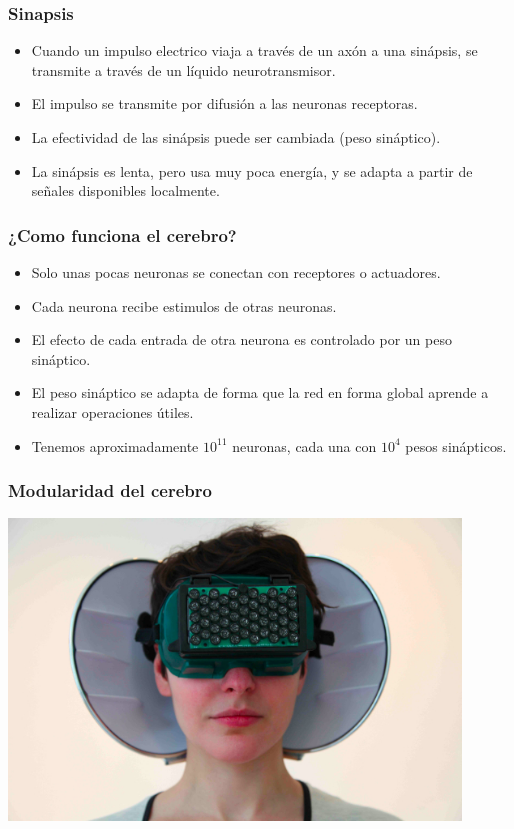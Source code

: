 \documentclass{beamer}
\begin{document}
\begin{frame}
  \frametitle{Sinapsis}
  \begin{itemize}
  \item Cuando un impulso electrico viaja a través de un axón a una sinápsis, se transmite
    a través de un líquido neurotransmisor.
  \item El impulso se transmite por difusión a las neuronas receptoras.
  \item La efectividad de las sinápsis puede ser cambiada (peso sináptico).
  \item La sinápsis es lenta, pero usa muy poca energía, y se adapta a partir de señales disponibles localmente.
  \end{itemize}
\end{frame}

\begin{frame}
  \frametitle{¿Como funciona el cerebro?}
  \begin{itemize}
  \item Solo unas pocas neuronas se conectan con receptores o actuadores.
  \item Cada neurona recibe estimulos de otras neuronas.
  \item El efecto de cada entrada de otra neurona es controlado por
    un peso sináptico.
  \item El peso sináptico se adapta de forma que la red en forma global
    aprende a realizar operaciones útiles.
  \item Tenemos aproximadamente $10^{11}$ neuronas, cada una con $10^4$ pesos sinápticos.
  \end{itemize}
\end{frame}

\begin{frame}
  \frametitle{Modularidad del cerebro}
  \begin{center}
    \includegraphics[width=0.9\textwidth]{imag/echo.jpg}
  \end{center}

\end{frame}
\end{document}
